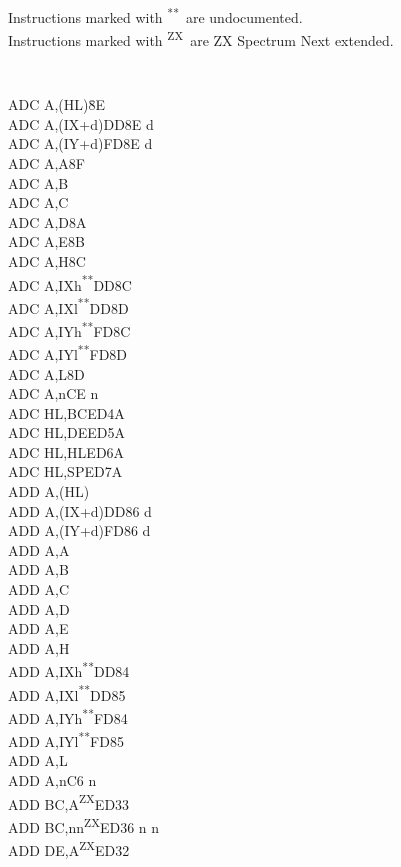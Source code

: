 \documentclass[12pt,twoside,openright,a4paper]{book}
\newcommand{\UNDOC}{\textnormal{\textsuperscript{**}}}
\newcommand{\ZXN}{\textnormal{\textsuperscript{ZX}}}
\begin{document}
Instructions marked with \UNDOC ~are undocumented.\\
Instructions marked with \ZXN ~are ZX Spectrum Next extended.
\setlength\columnsep{4em}
\begin{multicols}{3}
{
	\tt 
	\small
	\begin{tabbing}
	ADC A,(HL){\qquad}{\quad}\=8E\\
	ADC A,(IX+d)\>DD8E d\\
	ADC A,(IY+d)\>FD8E d\\
	ADC A,A\>8F\\
	ADC A,B\\
	ADC A,C\\
	ADC A,D\>8A\\
	ADC A,E\>8B\\
	ADC A,H\>8C\\
	ADC A,IXh\UNDOC\>DD8C\\
	ADC A,IXl\UNDOC\>DD8D\\
	ADC A,IYh\UNDOC\>FD8C\\
	ADC A,IYl\UNDOC\>FD8D\\
	ADC A,L\>8D\\
	ADC A,n\>CE n\\
	ADC HL,BC\>ED4A\\
	ADC HL,DE\>ED5A\\
	ADC HL,HL\>ED6A\\
	ADC HL,SP\>ED7A\\
	ADD A,(HL)\\
	ADD A,(IX+d)\>DD86 d\\
	ADD A,(IY+d)\>FD86 d\\
	ADD A,A\\
	ADD A,B\\
	ADD A,C\\
	ADD A,D\\
	ADD A,E\\
	ADD A,H\\
	ADD A,IXh\UNDOC\>DD84\\
	ADD A,IXl\UNDOC\>DD85\\
	ADD A,IYh\UNDOC\>FD84\\
	ADD A,IYl\UNDOC\>FD85\\
	ADD A,L\\
	ADD A,n\>C6 n\\
	ADD BC,A\ZXN\>ED33\\
	ADD BC,nn\ZXN\>ED36	n n\\
	ADD DE,A\ZXN\>ED32\\

\end{tabbing}}
\end{multicols}
\end{document}
